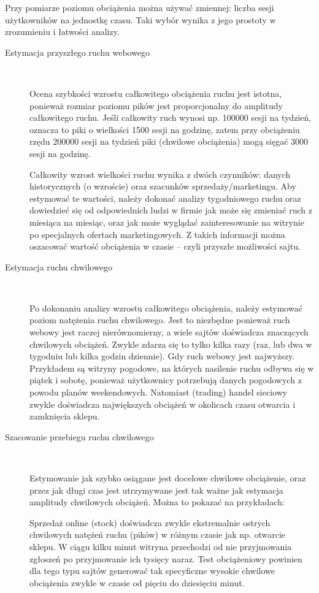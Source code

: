 \begin{enumerate}
Przy pomiarze poziomu obciążenia można używać zmiennej: liczba sesji użytkowników na jednostkę czasu. Taki wybór wynika z jego 
prostoty w zrozumieniu i łatwości analizy.

    \begin{description}
    \item[Estymacja przyszłego ruchu webowego]\

Ocena szybkości wzrostu całkowitego obciążenia ruchu jest istotna, ponieważ rozmiar poziomu pików jest 
proporcjonalny do amplitudy całkowitego ruchu. Jeśli całkowity ruch wynosi np. 100000 sesji na tydzień, oznacza to piki o 
wielkości 1500 sesji na godzinę, zatem przy obciążeniu rzędu 200000 sesji na tydzień piki (chwilowe obciążenia) mogą sięgać 
3000 sesji na godzinę. 

Całkowity wzrost wielkości ruchu wynika z dwóch czynników: danych historycznych (o wzroście) oraz szacunków 
sprzedaży/marketingu. Aby estymować te wartości, należy dokonać analizy tygodniowego ruchu oraz dowiedzieć się od odpowiednich 
ludzi w firmie jak może się zmieniać ruch z miesiąca na miesiąc, oraz jak może wyglądać zainteresowanie na witrynie po 
specjalnych ofertach marketingowych. Z takich informacji można oszacować wartość obciążenia w czasie -- czyli przyszłe 
możliwości sajtu. 

    \item[Estymacja ruchu chwilowego]\

Po dokonaniu analizy wzrostu całkowitego obciążenia, należy estymować poziom natężenia ruchu chwilowego. Jest to niezbędne 
ponieważ ruch webowy jest raczej nierównomierny, a wiele sajtów doświadcza znaczących chwilowych obciążeń. Zwykle zdarza się 
to tylko kilka razy (raz, lub dwa w tygodniu lub kilka godzin dziennie). Gdy ruch webowy jest najwyższy. Przykładem są witryny 
pogodowe, na których nasilenie ruchu odbywa się w piątek i sobotę, ponieważ użytkownicy potrzebują danych pogodowych z powodu 
planów weekendowych. Natomiast (trading) handel sieciowy zwykle doświadcza największych obciążeń w okolicach czasu otwarcia i 
zamknięcia sklepu. 

    \item[Szacowanie przebiegu ruchu chwilowego]\

Estymowanie jak szybko osiągane jest docelowe chwilowe obciążenie, oraz przez jak długi czas jest utrzymywane jest tak ważne 
jak estymacja amplitudy chwilowych obciążeń. Można to pokazać na przykładach:

Sprzedaż online (stock) doświadcza zwykle ekstremalnie ostrych chwilowych natężeń ruchu (pików) w różnym czasie jak np. 
otwarcie sklepu. W ciągu kilku minut witryna przechodzi od nie przyjmowania zgłoszeń po przyjmowanie ich tysięcy naraz. Test 
obciążeniowy powinien dla tego typu sajtów generować tak specyficzne wysokie chwilowe obciążenia zwykle w czasie od pięciu do 
dziesięciu minut. 


\end{description}
\end{enumerate}
